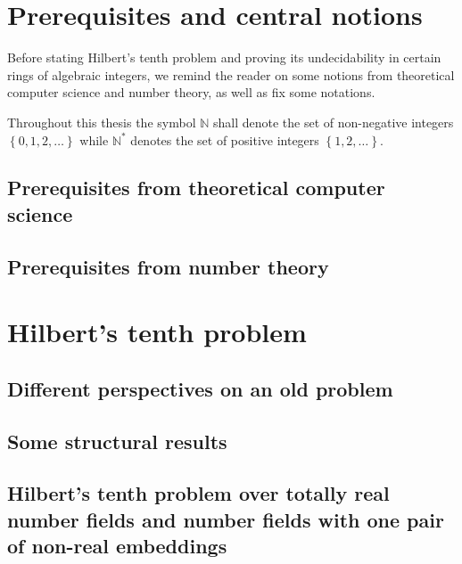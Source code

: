 \documentclass[12pt,a4paper]{scrbook}
\numberwithin{equation}{section}
\newcommand{\set}[1]{\left\lbrace #1 \right\rbrace}
\begin{document}

\allowdisplaybreaks

\frontmatter



\mainmatter
{}

\chapter{Prerequisites and central notions}

Before stating Hilbert's tenth problem and proving its undecidability in
certain rings of algebraic integers, we remind the reader on some
notions from theoretical computer science and number theory, as well as
fix some notations.

Throughout this thesis the symbol $ℕ$ shall denote the set of non-negative
integers $\set{0, 1, 2, …}$ while $ℕ^*$ denotes the set of positive integers
$\set{1, 2, …}$.

\section{Prerequisites from theoretical computer science}


\section{Prerequisites from number theory}


\chapter{Hilbert's tenth problem}

\section{Different perspectives on an old problem}


\section{Some structural results}


\section[\textsc{H10} over totally real number fields or fields with one  pair of conjugate embeddings]{Hilbert's tenth problem over totally real number fields and number fields with one pair of non-real embeddings}

\end{document}

